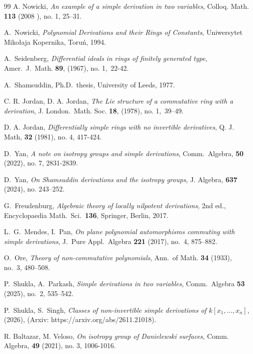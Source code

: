 \documentclass[11pt]{amsart}
\theoremstyle{definition}
\theoremstyle{remark}
\numberwithin{equation}{theorem}
\begin{document}
\begin{thebibliography}{99}
 A. Nowicki, \emph{An example of a simple derivation in two variables}, Colloq. Math.
\textbf{113} (2008
), no. 1, 25--31.

 A.~Nowicki, \emph{Polynomial Derivations and their Rings of Constants}, Uniwersytet
Miko\l aja Kopernika, Toru\'n, 1994.

 A.~Seidenberg, \emph{Differential ideals in rings of finitely generated type}, Amer.~J.~Math. \textbf{89}, (1967), no. 1,~22-42. 

 A.~Shamsuddin, Ph.D.\ thesis, University of Leeds, 1977.

 C. R. Jordan, D. A. Jordan, \emph{The Lie structure of a commutative ring with a derivation}, J. London.~Math. Soc. \textbf{18}, (1978), no. 1,~39--49. 

 D. A. Jordan, \emph{Differentially simple rings with no invertible derivatives}, Q. J. Math, \textbf{32} (1981), no. 4, 417-424.


 D.~Yan, \emph{A note on isotropy groups and simple derivations}, Comm.~Algebra, \textbf{50} (2022), no. 7, 2831-2839.

 D.~Yan, \emph{On Shamsuddin derivations and the isotropy groups}, J. Algebra, \textbf{637} (2024), no. 243--252.

 G.~Freudenburg, \emph{Algebraic theory of locally nilpotent derivations}, 2nd ed.,
Encyclopaedia Math.\ Sci.\ \textbf{136}, Springer, Berlin, 2017.

 L.~G.~Mendes, I.~Pan, \emph{On plane polynomial automorphisms commuting with simple
derivations}, J.~Pure Appl.~Algebra \textbf{221} (2017), no.~4, 875--882.

 O.~Ore, \emph{Theory of non-commutative polynomials}, Ann.~of Math. \textbf{34} (1933), no.~3, 480--508. 

 P.~Shukla, A.~Parkash, \emph{Simple derivations in two variables}, Comm.~Algebra
\textbf{53} (2025), no.~2, 535--542.

 P.~Shukla, S.~Singh, \emph{Classes of non-invertible simple derivations of $k[x_1,\ldots,x_n]$}, (2026), (Arxiv: https://arxiv.org/abs/2611.21018).

 R. Baltazar, M. Veloso, \emph{On isotropy group of Danielewski surfaces}, Comm. Algebra, \textbf{49} (2021), no. 3, 1006-1016.


\end{thebibliography}
\end{document}
